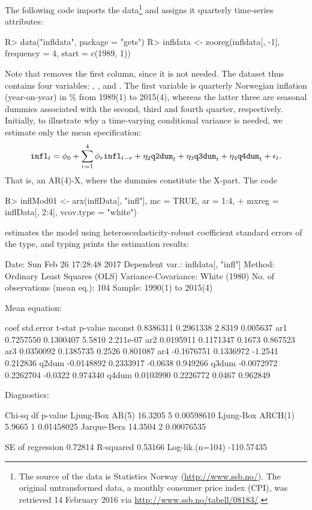 \documentclass[article,nojss]{jss}
\begin{document}
The following code imports the data\footnote{The source of the data is
  Statistics Norway (\url{http://www.ssb.no/}). The
  original untransformed data, a monthly consumer price index (CPI),
  was retrieved 14 February 2016 via
  \url{http://www.ssb.no/tabell/08183/}.}  and assigns it quarterly
time-series attributes:
%
\begin{CodeChunk}
\begin{CodeInput}
R> data("infldata", package = "gets")
R> infldata <- zooreg(infldata[, -1], frequency = 4, start = c(1989, 1))
\end{CodeInput}
\end{CodeChunk}
%
Note that \code{[, -1]} removes the first column, since it is not
needed. The dataset thus contains four variables: , ,
 and . The first variable is quarterly Norwegian
inflation (year-on-year) in \% from 1989(1) to 2015(4), whereas the
latter three are seasonal dummies associated with the second, third
and fourth quarter, respectively. Initially, to illustrate why a
time-varying conditional variance is needed, we estimate only the mean
specification:
%
\begin{equation}
  \verb|infl|_t = \phi_0 + \sum_{r=1}^4 \phi_r \verb|infl|_{t-r} + \eta_2 \verb|q2dum|_{t} + \eta_3 \verb|q3dum|_{t} + \eta_4 \verb|q4dum|_{t} + \epsilon_t.
\end{equation}
%
That is, an AR(4)-X, where the dummies constitute the X-part. The code
%
\begin{CodeChunk}
\begin{CodeInput}
R> inflMod01 <- arx(inflData[, "infl"], mc = TRUE, ar = 1:4,
+    mxreg = inflData[, 2:4], vcov.type = "white")
\end{CodeInput}
\end{CodeChunk}
%
estimates the model using heteroscedasticity-robust coefficient standard errors of the \cite{White80} type, and typing  prints the estimation results:
%
\begin{CodeChunk}
\begin{CodeOutput}
Date: Sun Feb 26 17:28:48 2017 
Dependent var.: infldata[, "infl"] 
Method: Ordinary Least Squares (OLS) 
Variance-Covariance: White (1980) 
No. of observations (mean eq.): 104 
Sample: 1990(1) to 2015(4) 

Mean equation:

             coef  std.error  t-stat   p-value
mconst  0.8386311  0.2961338  2.8319  0.005637
ar1     0.7257550  0.1300407  5.5810 2.211e-07
ar2     0.0195911  0.1171347  0.1673  0.867523
ar3     0.0350092  0.1385735  0.2526  0.801087
ar4    -0.1676751  0.1336972 -1.2541  0.212836
q2dum  -0.0148892  0.2333917 -0.0638  0.949266
q3dum  -0.0072972  0.2262704 -0.0322  0.974340
q4dum   0.0103990  0.2226772  0.0467  0.962849

Diagnostics:

                   Chi-sq df    p-value
Ljung-Box AR(5)   16.3205  5 0.00598610
Ljung-Box ARCH(1)  5.9665  1 0.01458025
Jarque-Bera       14.3504  2 0.00076535

SE of regression    0.72814
R-squared           0.53166
Log-lik.(n=104)  -110.57435
\end{CodeOutput}
\end{CodeChunk}
\end{document}
